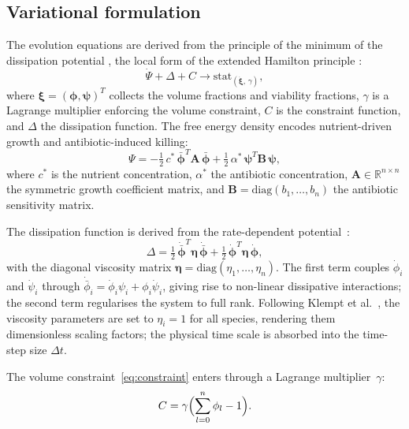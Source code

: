 \documentclass[11pt,a4paper]{article}
\newcommand{\bphi}{\boldsymbol{\phi}}
\newcommand{\bpsi}{\boldsymbol{\psi}}
\newcommand{\Real}{\mathbb{R}}
\begin{document}
\subsection{Variational formulation}
The evolution equations are derived from the principle of the minimum of the dissipation potential \cite{junker2014principle, hackl1997generalized}, the local form of the extended Hamilton principle \cite{JunkerBalzani2021ExtendedHamilton, JunkerBodeHackl2025Holistic}:
\begin{equation}
    \dot{\Psi} + \Delta + C \rightarrow \mathrm{stat}_{(\dot{\boldsymbol{\xi}}, \, \gamma)},
    \label{eq:variational_local}
\end{equation}
where $\boldsymbol{\xi} = (\boldsymbol{\phi}, \boldsymbol{\psi})^T$ collects the volume fractions and viability fractions, $\gamma$ is a Lagrange multiplier enforcing the volume constraint, $C$ is the constraint function, and $\Delta$ the dissipation function. The free energy density encodes nutrient-driven growth and antibiotic-induced killing:
\begin{equation}
\Psi = -\tfrac{1}{2}\,c^*\,\bar{\bphi}^T \mathbf{A}\,\bar{\bphi}
      + \tfrac{1}{2}\,\alpha^*\,\bpsi^T \mathbf{B}\,\bpsi,
\label{eq:psi}
\end{equation}
where $c^*$ is the nutrient concentration, $\alpha^*$ the antibiotic concentration, $\mathbf{A}\in\Real^{n\times n}$ the symmetric growth coefficient matrix, and $\mathbf{B}=\mathrm{diag}(b_1,\dots,b_n)$ the antibiotic sensitivity matrix.

The dissipation function is derived from the rate-dependent potential~\cite{Klempt2025ContinuumBiofilm}:
\begin{equation}
\Delta = \tfrac{1}{2}\,\dot{\bar{\bphi}}^T\boldsymbol{\eta}\,\dot{\bar{\bphi}}
          + \tfrac{1}{2}\,\dot{\bphi}^T\boldsymbol{\eta}\,\dot{\bphi},
\label{eq:dissipation}
\end{equation}
with the diagonal viscosity matrix $\boldsymbol{\eta}=\mathrm{diag}(\eta_1,\dots,\eta_n)$. The first term couples $\dot\phi_i$ and $\dot\psi_i$ through $\dot{\bar\phi}_i = \dot\phi_i\psi_i + \phi_i\dot\psi_i$, giving rise to non-linear dissipative interactions; the second term regularises the system to full rank. Following Klempt et al.~\cite{Klempt2025ContinuumBiofilm}, the viscosity parameters are set to $\eta_i=1$ for all species, rendering them dimensionless scaling factors; the physical time scale is absorbed into the time-step size $\Delta t$.

The volume constraint~\eqref{eq:constraint} enters through a Lagrange multiplier~$\gamma$:
\begin{equation}
C = \gamma\Bigl(\sum_{l=0}^{n}\phi_l - 1\Bigr).
\label{eq:cfunc}
\end{equation}
\end{document}
